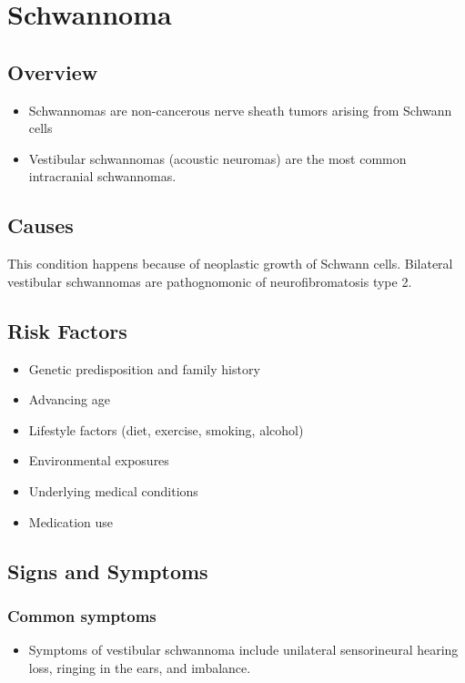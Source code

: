 \chapter{Schwannoma}
\label{sec:Schwannoma}

\section{Overview}


\begin{itemize}[noitemsep]
  \item Schwannomas are non-cancerous nerve sheath tumors arising from Schwann cells
  \item Vestibular schwannomas (acoustic neuromas) are the most common intracranial schwannomas.
\end{itemize}
\section{Causes}
This condition happens because of neoplastic growth of Schwann cells. Bilateral vestibular schwannomas are pathognomonic of neurofibromatosis type 2.     
\section{Risk Factors}

\begin{itemize}[noitemsep]
  \item Genetic predisposition and family history
  \item Advancing age
  \item Lifestyle factors (diet, exercise, smoking, alcohol)
  \item Environmental exposures
  \item Underlying medical conditions
  \item Medication use
\end{itemize}
\section{Signs and Symptoms}

\subsection{Common symptoms}
\begin{itemize}[noitemsep]
  \item Symptoms of vestibular schwannoma include unilateral sensorineural hearing loss, ringing in the ears, and imbalance. 
  \end{itemize}

